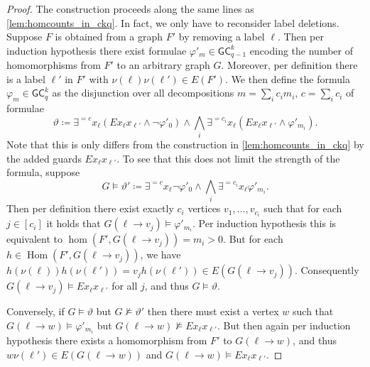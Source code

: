 \documentclass[a4paper,UKenglish,cleveref, autoref, thm-restate]{lipics-v2021}
\renewcommand{\theta}{\vartheta}
\newcommand{\lGC}{\ensuremath{\mathsf{GC}}}
\DeclareMathOperator{\HOM}{Hom}
\begin{document}
  \gcHomcap*

    \begin{proof}
    The construction proceeds along the same lines as \cref{lem:homcounts_in_ckq}. In fact, we only have to reconsider label deletions. Suppose $F$ is obtained from a graph $F'$ by removing a label $\ell$. Then per induction hypothesis there exist formulae $\varphi'_m \in \mathsf{GC}_{q-1}^k$ encoding the number of homomorphisms from $F'$ to an arbitrary graph $G$. Moreover, per definition there is a label $\ell'$ in $F'$ with $\nu(\ell)\nu(\ell') \in E(F')$. We then define the formula $\varphi_m \in \lGC_{q}^k$ as the disjunction over all decompositions $m = \sum_i c_im_i$, $c = \sum_i c_i$ of formulae
    \begin{equation*}
      \theta \coloneqq \exists^{=c}x_\ell (Ex_{\ell}x_{\ell'} \land \neg \varphi'_0) \land \bigwedge_i \exists^{=c_i}x_\ell(Ex_{\ell}x_{\ell'} \land \varphi'_{m_i}).
    \end{equation*}
    Note that this is only differs from the construction in \cref{lem:homcounts_in_ckq} by the added guards $Ex_{\ell}x_{\ell'}$. To see that this does not limit the strength of the formula, suppose
    \begin{equation*}
      G \models \theta' \coloneqq \exists^{=c}x_\ell \neg \varphi'_0 \land \bigwedge_i \exists^{=c_i}x_\ell\varphi'_{m_i}.
    \end{equation*}
    Then per definition there exist exactly $c_i$ vertices $v_1, \dots, v_{c_i}$ such that for each $j \in [c_i]$ it holds that $G(\ell \to v_j) \models \varphi'_{m_i}$. Per induction hypothesis this is equivalent to $\hom(F', G(\ell \to v_j)) = m_i > 0$. But for each $h \in \HOM(F', G(\ell \to v_j))$, we have $h(\nu(\ell))h(\nu(\ell')) = v_jh(\nu(\ell')) \in E(G(\ell \to v_j))$. Consequently $G(\ell \to v_j) \models Ex_{\ell}x_{\ell'}$ for all $j$, and thus $G \models \theta$.

    Conversely, if $G \models \theta$ but $G \not\models \theta'$ then there must exist a vertex $w$ such that $G(\ell \to w) \models \varphi'_{m_i}$ but $G(\ell \to w) \not\models Ex_{\ell}x_{\ell'}$. But then again per induction hypothesis there exists a homomorphism from $F'$ to $G(\ell \to w)$, and thus $w\nu(\ell') \in E(G(\ell \to w))$ and $G(\ell \to w) \models Ex_{\ell}x_{\ell'}$.
  \end{proof}

  \qgFromGckq*
\end{document}
